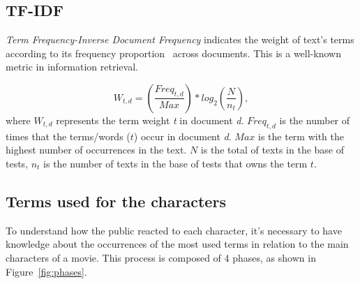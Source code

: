 \subsection{TF-IDF\label{TFID}}

\textit{Term Frequency-Inverse Document Frequency} indicates the weight of text's terms according to its frequency proportion~\cite{Dipanjan:2016} across documents. This %
is a well-known metric in information retrieval. %


\begin{equation*}
    W_{t,d} = \left ( \frac{Freq_{t,d}}{Max} \right ) * log_2 \left ( \frac{N}{n_t} \right),
\end{equation*}
where \( W_{t,d}\) represents the term weight \textit{t} in document \textit{d}. 
\( Freq_{t,d}\) is the number of times that the terms/words ($t$) occur in document \textit{d}. 
\( Max\) is the term with the highest number of occurrences in the text. 
\( N \) is the total of texts in the base of tests, \( n_t \) is the number of texts in the base of tests that owns the term \( t \). 



\subsection{Terms used for the characters}
To understand how the public reacted to each character, it's necessary to have knowledge about the occurrences of the most used terms in relation to the main characters of a movie. This process is composed of 4 phases, as shown in Figure~\ref{fig:phases}. 


